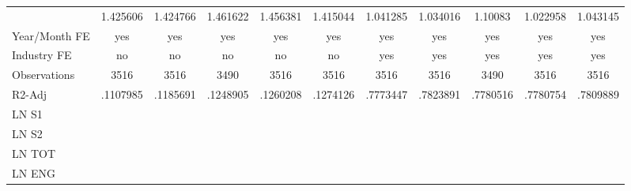 \begin{table}[htbp]
\begin{tabular}{l*{10}{c}}
                & 1.425606         & 1.424766         & 1.461622         & 1.456381         & 1.415044         & 1.041285         & 1.034016         &  1.10083         & 1.022958         & 1.043145         \\
Year/Month FE   &      yes         &      yes         &      yes         &      yes         &      yes         &      yes         &      yes         &      yes         &      yes         &      yes         \\
Industry FE     &       no         &       no         &       no         &       no         &       no         &      yes         &      yes         &      yes         &      yes         &      yes         \\
Observations    &     3516         &     3516         &     3490         &     3516         &     3516         &     3516         &     3516         &     3490         &     3516         &     3516         \\
R2-Adj          & .1107985         & .1185691         & .1248905         & .1260208         & .1274126         & .7773447         & .7823891         & .7780516         & .7780754         & .7809889         \\
LN S1           &                  &                  &                  &                  &                  &                  &                  &                  &                  &                  \\
LN S2           &                  &                  &                  &                  &                  &                  &                  &                  &                  &                  \\
LN TOT          &                  &                  &                  &                  &                  &                  &                  &                  &                  &                  \\
LN ENG          &                  &                  &                  &                  &                  &                  &                  &                  &                  &                  \\
\end{tabular}
\end{table}
